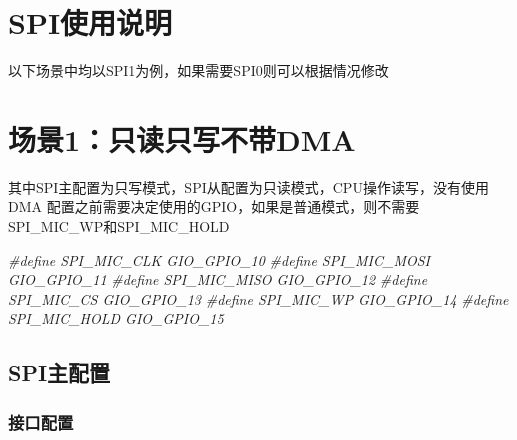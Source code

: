 \documentclass[
  12pt,
]{book}
\newenvironment{Shaded}{\begin{snugshade}}{\end{snugshade}}
\newcommand{\PreprocessorTok}[1]{\textcolor[rgb]{0.56,0.35,0.01}{\textit{#1}}}
\begin{document}
\hypertarget{spiux4f7fux7528ux8bf4ux660e}{%
\section{SPI使用说明}\label{spiux4f7fux7528ux8bf4ux660e}}

以下场景中均以SPI1为例，如果需要SPI0则可以根据情况修改

\hypertarget{ux573aux666f1ux53eaux8bfbux53eaux5199ux4e0dux5e26dma}{%
\section{场景1：只读只写不带DMA}\label{ux573aux666f1ux53eaux8bfbux53eaux5199ux4e0dux5e26dma}}

其中SPI主配置为只写模式，SPI从配置为只读模式，CPU操作读写，没有使用DMA 配置之前需要决定使用的GPIO，如果是普通模式，则不需要SPI\_MIC\_WP和SPI\_MIC\_HOLD

\begin{Shaded}
\begin{Highlighting}[]
\PreprocessorTok{#define SPI_MIC_CLK         GIO_GPIO_10}
\PreprocessorTok{#define SPI_MIC_MOSI        GIO_GPIO_11}
\PreprocessorTok{#define SPI_MIC_MISO        GIO_GPIO_12}
\PreprocessorTok{#define SPI_MIC_CS          GIO_GPIO_13}
\PreprocessorTok{#define SPI_MIC_WP          GIO_GPIO_14}
\PreprocessorTok{#define SPI_MIC_HOLD        GIO_GPIO_15}
\end{Highlighting}
\end{Shaded}

\hypertarget{spiux4e3bux914dux7f6e}{%
\subsection{SPI主配置}\label{spiux4e3bux914dux7f6e}}

\hypertarget{ux63a5ux53e3ux914dux7f6e}{%
\subsubsection{接口配置}\label{ux63a5ux53e3ux914dux7f6e}}
\end{document}
